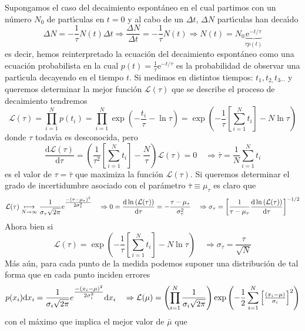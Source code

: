 \documentclass[spanish,titlepage,11pt]{article}
\begin{document}
Supongamos el caso del decaimiento espont\'{a}neo en el cual partimos con un
n\'{u}mero $N_{0}$ de part\'{\i}culas en $t=0$ y al cabo de un $\Delta t$,
$\Delta N$ part\'{\i}culas han deca\'{\i}do
\[
\Delta N=-\frac{1}{\tau}N(t)\Delta t\Rightarrow\frac{\Delta N}{\Delta
t}=-\frac{1}{\tau}N(t)\Rightarrow N(t)=N_{0}\underset{\tau p(t)}%
{\underbrace{\mathrm{e}^{-t/\tau}}}
\]
es decir, hemos reinterpretado la ecuaci\'{o}n del decaimiento espont\'{a}neo
como una ecuaci\'{o}n probabilista en la cual $p(t)=\frac{1}{\tau}%
\mathrm{e}^{-t/\tau}$ es la probabilidad de observar una part\'{\i}cula
decayendo en el tiempo $t.$ Si medimos en distintos tiempos: $t_{1}%
,t_{2,}t_{3\cdots}$ y queremos determinar la mejor funci\'{o}n $\mathcal{L}%
(\tau)$ que se describe el proceso de decaimiento tendremos
\[
\mathcal{L}(\tau)=\prod_{i=1}^{N}p(t_{i})=\prod_{i=1}^{N}\exp\left(
-\frac{t_{i}}{\tau}-\ln\tau\right)  =\exp\left(  -\frac{1}{\tau}\left[
\sum_{i=1}^{N}t_{i}\right]  -N\ln\tau\right)
\]
donde $\tau$ todav\'{\i}a es desconocida, pero
\[
\frac{\mathrm{d}\mathcal{L}(\tau)}{\mathrm{d}\tau}=\left(  \frac{1}{\tau^{2}%
}\left[  \sum_{i=1}^{N}t_{i}\right]  -\frac{N}{\tau}\right)  \mathcal{L}%
(\tau)=0\quad\Rightarrow\bar{\tau}=\frac{1}{N}\sum_{i=1}^{N}t_{i}
\]
es el valor de $\tau=\bar{\tau}$ que maximiza la funci\'{o}n $\mathcal{L}%
(\tau).$ Si queremos determinar el grado de incertidumbre asociado con el
par\'{a}metro $\bar{\tau}\equiv\mu_{\tau}$ es claro que
\[
\mathcal{L}(\tau)\underset{N\rightarrow\infty}{\longmapsto}\frac{1}%
{\sigma_{\tau}\sqrt{2\pi}}{\Large e}^{\tfrac{-\left(  \tau-\mu_{\tau}\right)
^{2}}{2\sigma_{\tau}^{2}}}\quad\Rightarrow0=\frac{\mathrm{d\ln}\left(
\mathcal{L}(\tau)\right)  }{\mathrm{d}\tau}=-\frac{\tau-\mu_{\tau}}%
{\sigma_{\tau}^{2}}\quad\Rightarrow\sigma_{\tau}=\left[  \frac{1}{\tau
-\mu_{\tau}}\frac{\mathrm{d\ln}\left(  \mathcal{L}(\tau)\right)  }%
{\mathrm{d}\tau}\right]  ^{-1/2}
\]
Ahora bien si
\[
\mathcal{L}(\tau)=\exp\left(  -\frac{1}{\tau}\left[  \sum_{i=1}^{N}%
t_{i}\right]  -N\ln\tau\right)  \quad\Rightarrow\sigma_{\tau}=\frac{\tau
}{\sqrt{N}}
\]
M\'{a}s a\'{u}n, para cada punto de la medida podemos suponer una
distribuci\'{o}n de tal forma que en cada punto inciden errores
\[
p(x_{i})\mathrm{d}x_{i}=\frac{1}{\sigma_{i}\sqrt{2\pi}}{\Large e}%
^{\tfrac{-\left(  x_{i}-\mu\right)  ^{2}}{2\sigma_{i}^{2}}}\mathrm{d}%
x_{i}\quad\Rightarrow\mathcal{L}(\mu)=\left(  \prod_{i=1}^{N}\frac{1}%
{\sigma_{i}\sqrt{2\pi}}\right)  \exp\left(  -\frac{1}{2}\sum_{i=1}^{N}\left[
\tfrac{\left(  x_{i}-\mu\right)  }{\sigma_{i}}\right]  ^{2}\right)
\]
con el m\'{a}ximo que implica el mejor valor de $\bar{\mu}$ que
\end{document}
